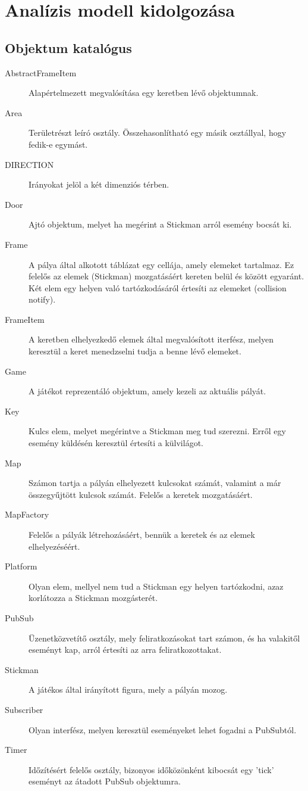 



\fedlap

\addtocounter{section}{2}
\section{Analízis modell kidolgozása}

	\subsection{Objektum katalógus}
		\begin{description}
			\item[AbstractFrameItem] Alapértelmezett megvalósítása egy keretben lévő objektumnak.
			\item[Area] Területrészt leíró osztály. Összehasonlítható egy másik osztállyal, hogy fedik-e egymást.
			\item[DIRECTION] Irányokat jelöl a két dimenziós térben.
			\item[Door] Ajtó objektum, melyet ha megérint a Stickman arról esemény bocsát ki.
			\item[Frame] A pálya által alkotott táblázat egy cellája, amely elemeket tartalmaz. Ez felelős az elemek (Stickman) mozgatásáért kereten belül és között egyaránt. Két elem egy helyen való tartózkodásáról értesíti az elemeket (collision notify).
			\item[FrameItem] A keretben elhelyezkedő elemek által megvalósított iterfész, melyen keresztül a keret menedzselni tudja a benne lévő elemeket.
			\item[Game] A játékot reprezentáló objektum, amely kezeli az aktuális pályát.
			\item[Key] Kulcs elem, melyet megérintve a Stickman meg tud szerezni. Erről egy esemény küldésén keresztül értesíti a külvilágot.
			\item[Map] Számon tartja a pályán elhelyezett kulcsokat számát, valamint a már összegyűjtött kulcsok számát. Felelős a keretek mozgatásáért.
			\item[MapFactory] Felelős a pályák létrehozásáért, bennük a keretek és az elemek elhelyezéséért.
			\item[Platform] Olyan elem, mellyel nem tud a Stickman egy helyen tartózkodni, azaz korlátozza a Stickman mozgásterét.
			\item[PubSub] Üzenetközvetítő osztály, mely feliratkozásokat tart számon, és ha valakitől eseményt kap, arról értesíti az arra feliratkozottakat.
			\item[Stickman] A játékos által irányított figura, mely a pályán mozog.
			\item[Subscriber] Olyan interfész, melyen keresztül eseményeket lehet fogadni a PubSubtól.
			\item[Timer] Időzítésért felelős osztály, bizonyos időközönként kibocsát egy 'tick' eseményt az átadott PubSub objektumra.
		\end{description}
	
